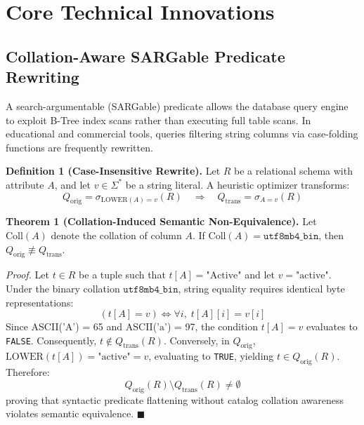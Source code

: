 \documentclass[conference]{IEEEtran}
\begin{document}
\section{Core Technical Innovations}

\subsection{Collation-Aware SARGable Predicate Rewriting}
A search-argumentable (SARGable) predicate allows the database query engine to exploit B-Tree index scans rather than executing full table scans. In educational and commercial tools, queries filtering string columns via case-folding functions are frequently rewritten.

\textbf{Definition 1 (Case-Insensitive Rewrite).} Let $R$ be a relational schema with attribute $A$, and let $v \in \Sigma^*$ be a string literal. A heuristic optimizer transforms:
\begin{equation}
    Q_{\text{orig}} = \sigma_{\text{LOWER}(A) = v}(R) \quad \Longrightarrow \quad Q_{\text{trans}} = \sigma_{A = v}(R)
\end{equation}

\textbf{Theorem 1 (Collation-Induced Semantic Non-Equivalence).} Let $\text{Coll}(A)$ denote the collation of column $A$. If $\text{Coll}(A) = \texttt{utf8mb4\_bin}$, then $Q_{\text{orig}} \not\equiv Q_{\text{trans}}$.

\textit{Proof.} Let $t \in R$ be a tuple such that $t[A] = \text{"Active"}$ and let $v = \text{"active"}$. Under the binary collation $\texttt{utf8mb4\_bin}$, string equality requires identical byte representations:
\begin{equation}
    (t[A] = v) \iff \forall i, \; t[A][i] = v[i]
\end{equation}
Since ASCII($\text{'A'}$) = 65 and ASCII($\text{'a'}$) = 97, the condition $t[A] = v$ evaluates to \texttt{FALSE}. Consequently, $t \notin Q_{\text{trans}}(R)$. Conversely, in $Q_{\text{orig}}$, $\text{LOWER}(t[A]) = \text{"active"} = v$, evaluating to \texttt{TRUE}, yielding $t \in Q_{\text{orig}}(R)$. Therefore:
\begin{equation}
    Q_{\text{orig}}(R) \setminus Q_{\text{trans}}(R) \neq \emptyset
\end{equation}
proving that syntactic predicate flattening without catalog collation awareness violates semantic equivalence. $\blacksquare$
\end{document}
